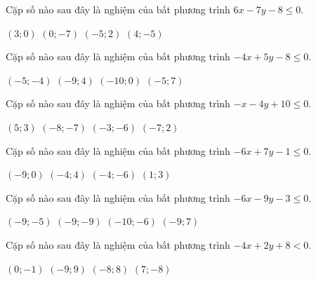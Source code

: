 \begin{ex}
 Cặp số nào sau đây là nghiệm của bất phương trình $6 x - 7 y - 8 \le 0$.

 
\choice
{ $(3; 0)$ }
   { $(0; -7)$ }
     { \True $(-5; 2)$ }
    { $(4; -5)$ }
\end{ex}

\begin{ex}
 Cặp số nào sau đây là nghiệm của bất phương trình $- 4 x + 5 y - 8 \le 0$.

 
\choice
{ \True $(-5; -4)$ }
   { $(-9; 4)$ }
     { $(-10; 0)$ }
    { $(-5; 7)$ }
\end{ex}

\begin{ex}
 Cặp số nào sau đây là nghiệm của bất phương trình $- x - 4 y + 10 \le 0$.

 
\choice
{ \True $(5; 3)$ }
   { $(-8; -7)$ }
     { $(-3; -6)$ }
    { $(-7; 2)$ }
\end{ex}

\begin{ex}
 Cặp số nào sau đây là nghiệm của bất phương trình $- 6 x + 7 y - 1 \le 0$.

 
\choice
{ $(-9; 0)$ }
   { $(-4; 4)$ }
     { \True $(-4; -6)$ }
    { $(1; 3)$ }
\end{ex}

\begin{ex}
 Cặp số nào sau đây là nghiệm của bất phương trình $- 6 x - 9 y - 3 \le 0$.

 
\choice
{ $(-9; -5)$ }
   { $(-9; -9)$ }
     { $(-10; -6)$ }
    { \True $(-9; 7)$ }
\end{ex}

\begin{ex}
 Cặp số nào sau đây là nghiệm của bất phương trình $- 4 x + 2 y + 8 < 0$.

 
\choice
{ $(0; -1)$ }
   { $(-9; 9)$ }
     { $(-8; 8)$ }
    { \True $(7; -8)$ }
\end{ex}

